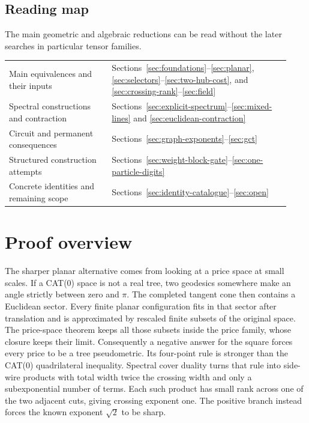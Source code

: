 \documentclass[11pt,a4paper]{article}
\theoremstyle{definition}
\theoremstyle{remark}
\begin{document}
\subsection*{Reading map}
The main geometric and algebraic reductions can be read without the
later searches in particular tensor families.
\begin{center}
\begin{tabular}{p{0.34\linewidth}p{0.59\linewidth}}
Main equivalences and their inputs &
Sections~\ref{sec:foundations}--\ref{sec:planar},
\ref{sec:selectors}--\ref{sec:two-hub-cost}, and
\ref{sec:crossing-rank}--\ref{sec:field}\\[3pt]
Spectral constructions and contraction &
Sections~\ref{sec:explicit-spectrum}--\ref{sec:mixed-lines} and
\ref{sec:euclidean-contraction}\\[3pt]
Circuit and permanent consequences &
Sections~\ref{sec:graph-exponents}--\ref{sec:gct}\\[3pt]
Structured construction attempts &
Sections~\ref{sec:weight-block-gate}--\ref{sec:one-particle-digits}\\[3pt]
Concrete identities and remaining scope &
Sections~\ref{sec:identity-catalogue}--\ref{sec:open}
\end{tabular}
\end{center}

\section{Proof overview}

The sharper planar alternative comes from looking at a price
space at small scales. If a CAT(0) space is not a real tree,
two geodesics somewhere make an angle strictly between zero and
$\pi$. The completed tangent cone then contains a Euclidean
sector. Every finite planar configuration fits in that sector
after translation and is approximated by rescaled finite subsets
of the original space. The price-space theorem keeps all those
subsets inside the price family, whose closure keeps their limit.
Consequently a negative answer for the square forces every
price to be a tree pseudometric. Its four-point rule is stronger
than the CAT(0) quadrilateral inequality. Spectral cover duality
turns that rule into side-wire products with total width twice
the crossing width and only a subexponential number of terms.
Each such product has small rank across one of the two adjacent
cuts, giving crossing exponent one. The positive branch instead
forces the known exponent $\sqrt2$ to be sharp.
\end{document}
